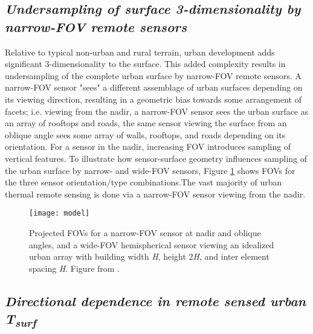 \begin{bibunit}

\subsection*{\textnormal{\textit{Undersampling of surface 3-dimensionality by narrow-FOV remote sensors}}}

Relative to typical non-urban and rural terrain, urban development adds significant 3-dimensionality to the surface. This added complexity results in undersampling of the complete urban surface by narrow-FOV remote sensors. A narrow-FOV sensor "sees" a different assemblage of urban surfaces depending on its viewing direction, resulting in a geometric bias towards some arrangement of facets; i.e. viewing from the nadir, a narrow-FOV sensor sees the urban surface as an array of rooftops and roads, the same sensor viewing the surface from an oblique angle sees some array of walls, rooftops, and roads depending on its orientation. For a sensor in the nadir, increasing FOV introduces sampling of vertical features. To illustrate how sensor-surface geometry influences sampling of the urban surface by narrow- and wide-FOV sensors, Figure \ref{model} shows FOVs for the three sensor orientation/type combinations.The vast majority of urban thermal remote sensing is done via a narrow-FOV sensor viewing from the nadir.

\begin{figure}[H]
	\centering
	\texttt{[image: model]}
	\caption{Projected FOVs for a narrow-FOV sensor at nadir and oblique angles, and a wide-FOV hemispherical sensor viewing an idealized urban array with building width \textit{H}, height 2\textit{H}, and inter element spacing \textit{H}. Figure from \cite{Adderley2015}.}
	\label{model}
\end{figure}

\subsection*{\textnormal{\textit{Directional dependence in remote sensed urban T\textsubscript{surf}}}}


\end{bibunit}
